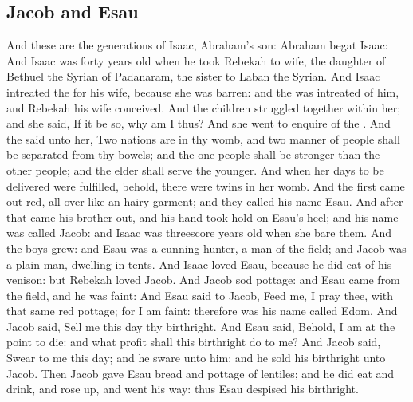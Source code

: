 \begin{biblechapter}
\section*{Jacob and Esau}
\verse And these are the generations of Isaac, Abraham's son: Abraham begat Isaac:
\verse And Isaac was forty years old when he took Rebekah to wife, the daughter of Bethuel the Syrian of Padanaram, the sister to Laban the Syrian.
\verse And Isaac intreated the \LORD for his wife, because she was barren: and the \LORD was intreated of him, and Rebekah his wife conceived.
\verse And the children struggled together within her; and she said, If it be so, why am I thus? And she went to enquire of the \LORD.
\verse And the \LORD said unto her, Two nations are in thy womb, and two manner of people shall be separated from thy bowels; and the one people shall be stronger than the other people; and the elder shall serve the younger.
\verse And when her days to be delivered were fulfilled, behold, there were twins in her womb.
\verse And the first came out red, all over like an hairy garment; and they called his name Esau.
\verse And after that came his brother out, and his hand took hold on Esau's heel; and his name was called Jacob: and Isaac was threescore years old when she bare them.
\verse And the boys grew: and Esau was a cunning hunter, a man of the field; and Jacob was a plain man, dwelling in tents.
\verse And Isaac loved Esau, because he did eat of his venison: but Rebekah loved Jacob.
\verse And Jacob sod pottage: and Esau came from the field, and he was faint:
\verse And Esau said to Jacob, Feed me, I pray thee, with that same red pottage; for I am faint: therefore was his name called Edom.
\verse And Jacob said, Sell me this day thy birthright.
\verse And Esau said, Behold, I am at the point to die: and what profit shall this birthright do to me?
\verse And Jacob said, Swear to me this day; and he sware unto him: and he sold his birthright unto Jacob.
\verse Then Jacob gave Esau bread and pottage of lentiles; and he did eat and drink, and rose up, and went his way: thus Esau despised his birthright.
\end{biblechapter}

